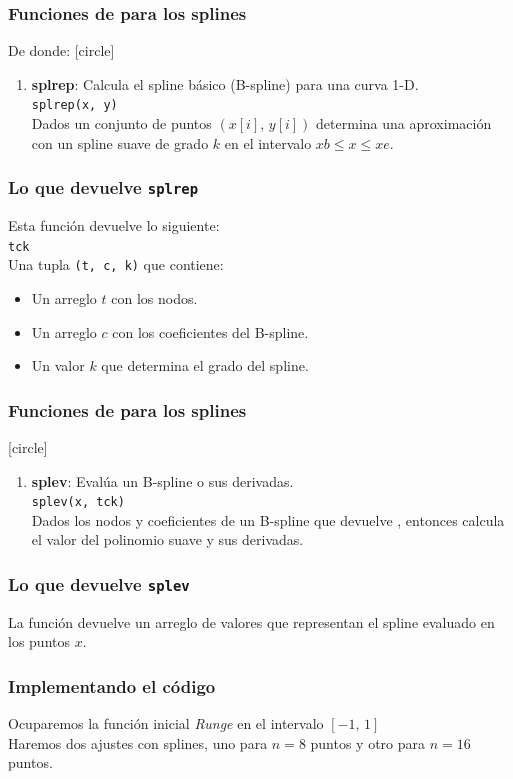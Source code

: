 \begin{frame}[fragile]
\frametitle{Funciones de \python{} para los splines}
De donde:
[circle]
\begin{enumerate}[<+->]
\item \textbf{splrep}: Calcula el spline básico (B-spline) para una curva 1-D.
\\
\medskip
\verb|splrep(x, y)|
\\
\bigskip
Dados un conjunto de puntos $(x[i], \, y[i])$ determina una aproximación con un spline suave de grado $k$ en el intervalo $xb \leq x \leq xe$.
\seti
\end{enumerate}
\end{frame}
\begin{frame}[fragile]
\frametitle{Lo que devuelve \texttt{splrep}}
Esta función devuelve lo siguiente:
\\
\bigskip
\verb|tck|
\\
\bigskip
Una tupla \texttt{(t, c, k)} que contiene:
\begin{itemize}
\item Un arreglo $t$ con los nodos.
\item Un arreglo $c$ con los coeficientes del B-spline.
\item Un valor $k$ que determina el grado del spline.
\end{itemize}
\end{frame}
\begin{frame}[fragile]
\frametitle{Funciones de \python{} para los splines}
[circle]
\begin{enumerate}[<+->]
\conti
\item \textbf{splev}: Evalúa un B-spline o sus derivadas. 
\\
\bigskip
\verb|splev(x, tck)|
\\
\bigskip
Dados los nodos y coeficientes de un B-spline que devuelve , entonces calcula el valor del polinomio suave y sus derivadas.
\end{enumerate}
\end{frame}
\begin{frame}
\frametitle{Lo que devuelve \texttt{splev}}
La función  devuelve un arreglo de valores que representan el spline evaluado en los puntos $x$.
\end{frame}
\begin{frame}
\frametitle{Implementando el código}
Ocuparemos la función inicial \emph{Runge} en el intervalo $[-1, \, 1]$
\\
\bigskip
\pause
Haremos dos ajustes con splines, uno para $n = 8$ puntos y otro para $n = 16$ puntos.
\end{frame}

